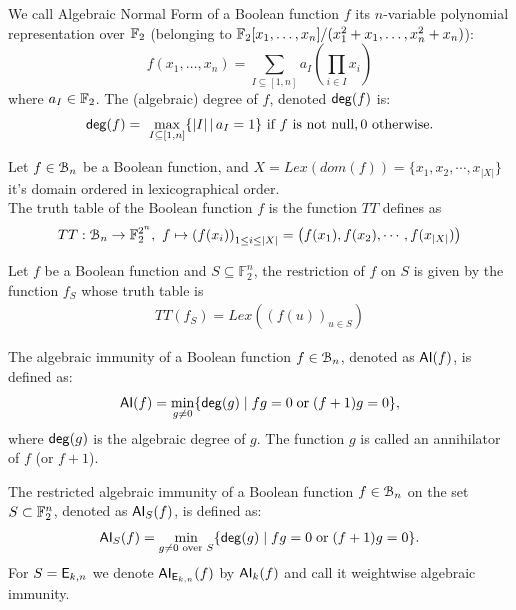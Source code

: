 \documentclass[11pt]{llncs}
\begin{document}
\begin{definition}\label{def:anf}
We call Algebraic Normal Form of a Boolean function $f$ its $n$-variable polynomial representation over $\mathbb{F}_2$ (\ie belonging to $\mathbb{F}_2[x_1,\dots,x_n]/(x_1^2+x_1,\dots,x_n^2+x_n)$):
	\[f(x_1,\dots,x_n)= \sum_{I \subseteq [1,n]} a_I \left( \prod_{i \in I} x_i \right) \]%
	where $a_I\in \mathbb{F}_2$. 
The (algebraic) degree of $f$, denoted $\mathsf{deg}(f)$ is: \[\mathsf{deg}(f)=\
\max_{I\subseteq [1,n]}\{ |I|\, | \, a_I=1\}  \text{ if $f$ is not null},0  \text{ otherwise}.\]
\end{definition}	

\begin{definition}
	Let $f\in \mathcal{B}_{n}$ be a Boolean function, and $X = Lex\left(dom(f)\right) = \{x_1, x_2, \cdots, x_{|X|}\}$ it's domain ordered in lexicographical order.\\
	The truth table of the Boolean function $f$ is the function $TT$ defines as
	\begin{align*}
	TT: \mathcal{B}_{n} \rightarrow \mathbb{F}_2^{2^n},\  f \mapsto \left(f(x_i)\right)_{1\leq i \leq |X|} = \left(f(x_1), f(x_2), \cdots, f(x_{|X|})\right)
	\end{align*}
\end{definition}

\begin{definition}[Restriction of $f$ on $S$]
	Let $f$ be a Boolean function and $S\subseteq \mathbb{F}_2^n$, the restriction of $f$ on $S$ is given by the function $f_S$ whose truth table is
	\begin{align*}
	TT(f_S) = Lex\left(\left(f(u)\right)_{u\in S}\right)
	\end{align*}
\end{definition}


\begin{definition} \label{def:ai}
	The algebraic immunity of a Boolean function $f\in \mathcal{B}_{n}$, denoted as $\mathsf{AI}(f)$, is defined as:
	\[ \mathsf{AI}(f) = \min_{g \neq 0}\{ \mathsf{deg}(g) \; | \; fg = 0 \; \text{or} \; (f + 1)g = 0 \}{,} \]
	where $\mathsf{deg}(g)$ is the algebraic degree of $g$.
	The function $g$ is called an annihilator of $f$ (or $f + 1$). 
	
The restricted algebraic immunity of a Boolean function $f\in \mathcal{B}_{n}$ on the set $S\subset \mathbb{F}_2^n$, denoted as $\mathsf{AI}_S(f)$, is defined as:
\[ \mathsf{AI}_S(f) = \min_{g \neq 0 \text{ over } S}\{ \mathsf{deg}(g) \; | \; fg = 0 \; \text{or} \; (f + 1)g = 0 \}{.} \]	
For $S=\mathsf{E}_{k,n}$ we denote $\mathsf{AI}_{\mathsf{E}_{k,n}}(f)$ by $\mathsf{AI}_{k}(f)$ and call it weightwise algebraic immunity.
	
	
\end{definition}
\end{document}
